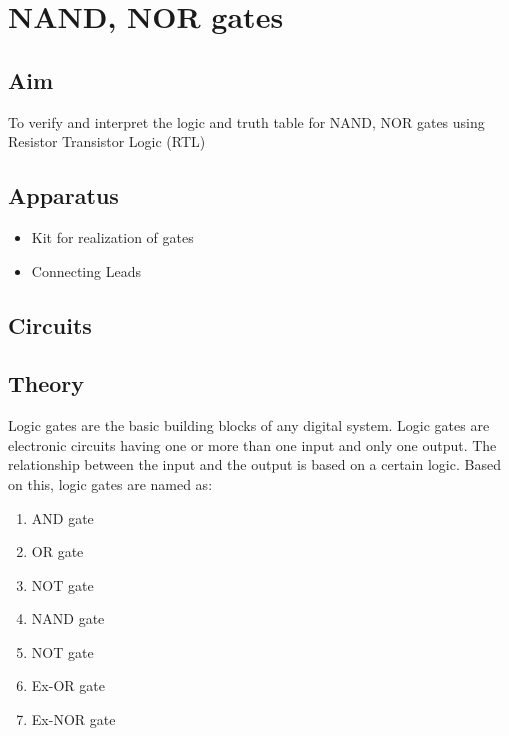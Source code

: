 \chapter{NAND, NOR gates}

\section{Aim}
	To verify and interpret the logic and truth table for NAND, NOR gates using Resistor Transistor Logic (RTL)

\section{Apparatus}
	\begin{itemize}
		\tightlist
		\item Kit for realization of gates
		\item Connecting Leads
	\end{itemize}

\section{Circuits}
	

\section{Theory}
	Logic gates are the basic building blocks of any digital system. Logic gates are electronic circuits having one or more than one input and only one output. The relationship between the input and the output is based on a certain logic. Based on this, logic gates are named as:
	\begin{enumerate}
		\tightlist
		\item AND gate
		\item OR gate
		\item NOT gate
		\item NAND gate
		\item NOT gate
		\item Ex-OR gate
		\item Ex-NOR gate
	\end{enumerate}
	
